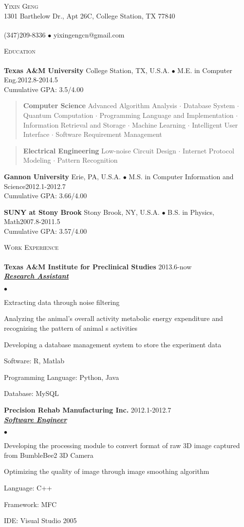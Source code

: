 \documentclass{article}
\newcommand{\area}[2]{\vspace*{-9pt} \begin{verse}\textbf{#1}   #2 \end{verse}  }
\newcommand{\lineunder}{\vspace*{-8pt} \\ \hspace*{-18pt} \hrulefill \\}
\newcommand{\header}[1]{{\hspace*{-15pt}\vspace*{6pt} \textsc{#1}} \vspace*{-6pt} \lineunder}
\newcommand{\employer}[3]{{ \textbf{#1} \hfill #2\\ \underline{\textbf{\emph{#3}}}\\  }}
\newcommand{\contact}[3]{
\vspace*{-8pt}
\begin{center}
{\LARGE \scshape {#1}}\\
#2 \lineunder 
#3
\end{center}
\vspace*{-8pt}
}
\newenvironment{achievements}{\begin{list}{$\bullet$}{\topsep 0pt \itemsep -2pt}}{\vspace*{4pt}\end{list}}
\newcommand{\schoolwithcourses}[5]{
 \textbf{#1} #2 $\bullet$ #3\hfill #4\\
 #5\\
\vspace*{5pt}
}
\begin{document}
\small
\smallskip
\vspace*{-44pt}

\contact{Yixin Geng}
{1301 Barthelow Dr., Apt 26C, College Station, TX 77840}
{(347)209-8336 $\bullet$ yixingengcn@gmail.com}

\header{Education}

\schoolwithcourses{Texas A\&M University}{College Station, TX, U.S.A.}{M.E. in Computer Eng.}{2012.8-2014.5}
{Cumulative GPA: 3.5/4.00}
	\area{Computer Science}{ Advanced Algorithm Analysis $\cdot$ Database System $\cdot$ Quantum Computation $\cdot$ Programming Language and Implementation $\cdot$ Information Retrieval and Storage $\cdot$ Machine Learning $\cdot$ Intelligent User Interface $\cdot$ Software Requirement Management}
	\area{Electrical Engineering}{Low-noise Circuit Design $\cdot$ Internet Protocol Modeling $\cdot$ Pattern Recognition}
\schoolwithcourses{Gannon University}{Erie, PA, U.S.A.}{M.S. in Computer Information and Science}{2012.1-2012.7}
{Cumulative GPA: 3.66/4.00}
\schoolwithcourses{SUNY at Stony Brook}{Stony Brook, NY, U.S.A.}{B.S. in Physics, Math}{2007.8-2011.5}
{Cumulative GPA: 3.57/4.00}

\header{Work Experience}
\employer{Texas A\&M Institute for Preclinical Studies}{2013.6-now}{Research Assistant}
	\begin{achievements}
	\item Extracting data through noise filtering
	\item Analyzing the animal's overall activity metabolic energy expenditure and recognizing the pattern of animal
	s activities
	\item Developing a database management system to store the experiment data
	\item Software: R, Matlab 
	\item Programming Language: Python, Java
	\item Database: MySQL
	\end{achievements}

\employer{Precision Rehab Manufacturing Inc.}{2012.1-2012.7}{Software Engineer}
	\begin{achievements}
	\item Developing the processing module to convert format of raw 3D image captured from BumbleBee2 3D Camera
	\item Optimizing the quality of image through image smoothing algorithm
	\item Language: C++
	\item Framework: MFC
	\item IDE: Visual Studio 2005
	\end{achievements}
\end{document}
